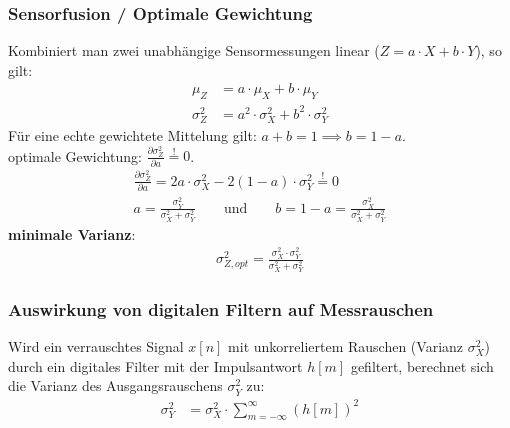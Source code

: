     \subsubsection{Sensorfusion / Optimale Gewichtung}
        Kombiniert man zwei unabhängige Sensormessungen linear ($Z = a \cdot X + b \cdot Y$), so gilt:
        \begin{align*}
            \mu_Z &= a \cdot \mu_X + b \cdot \mu_Y \\
            \sigma_Z^2 &= a^2 \cdot \sigma_X^2 + b^2 \cdot \sigma_Y^2
        \end{align*}
        Für eine echte gewichtete Mittelung gilt: $a+b = 1 \implies b = 1-a$. \\
        optimale Gewichtung: $\frac{\partial \sigma_Z^2}{\partial a} \stackrel{!}{=} 0$.     
        \begin{align*}
            \frac{\partial \sigma_Z^2}{\partial a} = 2a \cdot \sigma_X^2 - 2(1-a) \cdot \sigma_Y^2 \stackrel{!}{=} 0\\
            a = \frac{\sigma_Y^2}{\sigma_X^2 + \sigma_Y^2} \qquad \text{und} \qquad b = 1-a = \frac{\sigma_X^2}{\sigma_X^2 + \sigma_Y^2}
        \end{align*}
        \textbf{minimale Varianz}:
        \begin{align*}
            \sigma_{Z,opt}^2 = \frac{\sigma_X^2 \cdot \sigma_Y^2}{\sigma_X^2 + \sigma_Y^2} 
        \end{align*}

    \subsubsection{Auswirkung von digitalen Filtern auf Messrauschen}
        Wird ein verrauschtes Signal $x[n]$ mit unkorreliertem Rauschen (Varianz $\sigma_X^2$) durch ein digitales Filter mit der Impulsantwort $h[m]$ gefiltert, berechnet sich die Varianz des Ausgangsrauschens $\sigma_Y^2$ zu:
        \begin{align*}
            \sigma_Y^2 &= \sigma_X^2 \cdot \sum_{m=-\infty}^{\infty} (h[m])^2
        \end{align*}

